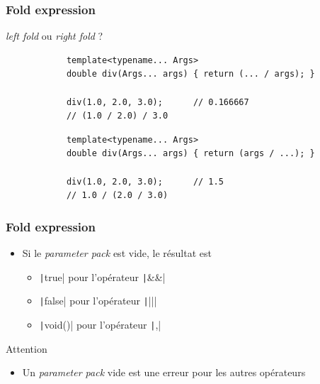 \documentclass[C++.tex]{subfiles}
\begin{document}
\begin{frame}[fragile]
	\frametitle{Fold expression}
	\begin{alertblock}{\textit{left fold} ou \textit{right fold} ?}
		\begin{verbatim}
			template<typename... Args>
			double div(Args... args) { return (... / args); }

			div(1.0, 2.0, 3.0);      // 0.166667
			// (1.0 / 2.0) / 3.0
		\end{verbatim}

		\begin{verbatim}
			template<typename... Args>
			double div(Args... args) { return (args / ...); }

			div(1.0, 2.0, 3.0);      // 1.5
			// 1.0 / (2.0 / 3.0)
		\end{verbatim}
	\end{alertblock}
\end{frame}

\begin{frame}[fragile]
	\frametitle{Fold expression}
	\begin{itemize}
		\item Si le \textit{parameter pack} est vide, le résultat est
		\begin{itemize}
			\item \texttt|true| pour l'opérateur \texttt|&&|
			\item \texttt|false| pour l'opérateur \texttt||||
			\item \texttt|void()| pour l'opérateur \texttt|,|
		\end{itemize}
	\end{itemize}

	\begin{alertblock}{Attention}
		\begin{itemize}
			\item Un \textit{parameter pack} vide est une erreur pour les autres opérateurs
		\end{itemize}
	\end{alertblock}
\end{frame}
\end{document}
